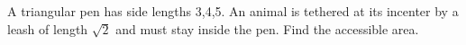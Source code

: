A triangular pen has side lengths 3,4,5. An animal is tethered at its incenter by a leash of length $\sqrt2$ and must stay inside the pen. Find the accessible area.
